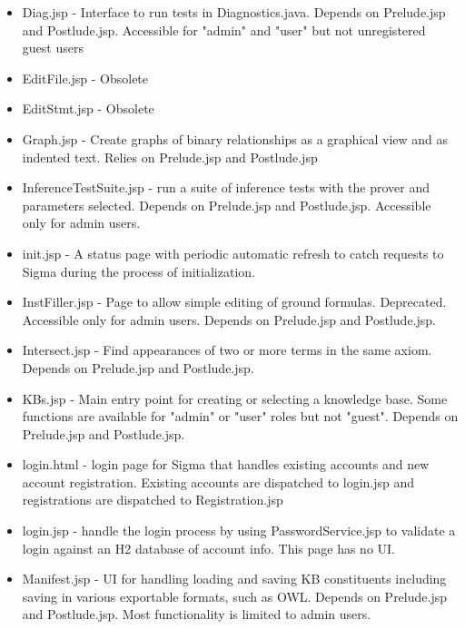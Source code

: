 \documentclass{book}
\begin{document}
\begin{itemize}
\item Diag.jsp - Interface to run tests in Diagnostics.java.  Depends on Prelude.jsp and Postlude.jsp.
Accessible for "admin" and "user" but not unregistered guest users

\item EditFile.jsp - Obsolete

\item EditStmt.jsp - Obsolete

\item Graph.jsp - Create graphs of binary relationships as a graphical view and as indented text.
Relies on Prelude.jsp and Postlude.jsp

\item InferenceTestSuite.jsp - run a suite of inference tests with the prover and parameters selected.
Depends on Prelude.jsp and Postlude.jsp.  Accessible only for admin users.

\item init.jsp - A status page with periodic automatic refresh to catch requests to Sigma during the
process of initialization.

\item InstFiller.jsp - Page to allow simple editing of ground formulas.  Deprecated.  Accessible only
for admin users. Depends on Prelude.jsp and Postlude.jsp.

\item Intersect.jsp - Find appearances of two or more terms in the same axiom.  Depends on
Prelude.jsp and Postlude.jsp.

\item KBs.jsp - Main entry point for creating or selecting a knowledge base.  Some functions are
available for "admin" or "user" roles but not "guest". Depends on Prelude.jsp and Postlude.jsp.

\item login.html - login page for Sigma that handles existing accounts and new account registration.
Existing accounts are dispatched to login.jsp and registrations are dispatched to
Registration.jsp

\item login.jsp - handle the login process by using PasswordService.jsp to validate a login against
an H2 database of account info.  This page has no UI.

\item Manifest.jsp - UI for handling loading and saving KB constituents including saving in various
exportable formats, such as OWL. Depends on Prelude.jsp and Postlude.jsp. Most functionality
is limited to admin users.


\end{itemize}
\end{document}
